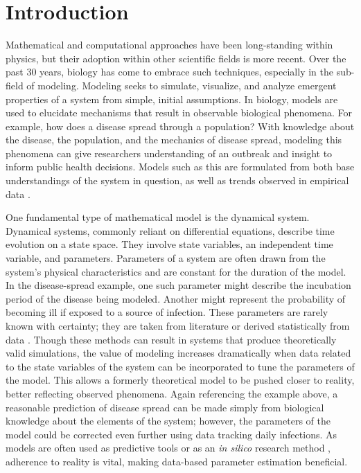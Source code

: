 \section{Introduction} \label{INTRODUCTION} Mathematical and computational approaches have been long-standing within physics, but their adoption within other scientific fields is more recent. Over the past 30 years, biology has come to embrace such techniques, especially in the sub-field of modeling. Modeling seeks to simulate, visualize, and analyze emergent properties of a system from simple, initial assumptions\cite{biomodel}. In biology, models are used to elucidate mechanisms that result in observable biological phenomena. For example, how does a disease spread through a population? With knowledge about the disease, the population, and the mechanics of disease spread, modeling this phenomena can give researchers understanding of an outbreak and insight to inform public health decisions. Models such as this are formulated from both base understandings of the system in question, as well as trends observed in empirical data \cite{biomodel}. 
\par One fundamental type of mathematical model is the dynamical system. Dynamical systems, commonly reliant on differential equations, describe time evolution on a state space. They involve state variables, an independent time variable, and parameters. Parameters of a system are often drawn from the system's physical characteristics and are constant for the duration of the model. In the disease-spread example, one such parameter might describe the incubation period of the disease being modeled. Another might represent the probability of becoming ill if exposed to a source of infection. These parameters are rarely known with certainty; they are taken from literature or derived statistically from data \cite{biomodel}. Though these methods can result in systems that produce theoretically valid simulations, the value of modeling increases dramatically when data related to the state variables of the system can be incorporated to tune the parameters of the model. This allows a formerly theoretical model to be pushed closer to reality, better reflecting observed phenomena. Again referencing the example above, a reasonable prediction of disease spread can be made simply from biological knowledge about the elements of the system; however, the parameters of the model could be corrected even further using data tracking daily infections. As models are often used as predictive tools or as an \emph{in silico} research method \cite{biomodel}, adherence to reality is vital, making data-based parameter estimation beneficial.
